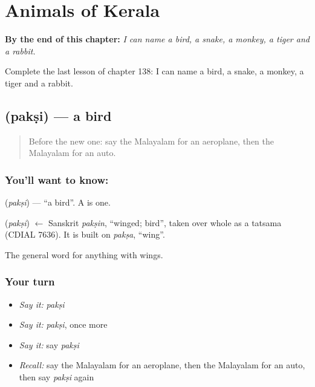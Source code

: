 
\chapter{Animals of Kerala}
\label{ch:ml-animals-of-kerala}

\begin{chapteropening}
\textbf{By the end of this chapter:} \emph{I can name a bird, a snake, a monkey, a tiger and a rabbit.}

Complete the last lesson of chapter 138: I can name a bird, a snake, a monkey, a tiger and a rabbit.
\end{chapteropening}

\section[\texorpdfstring{\ml{പക്ഷി} (pakṣi)}{പക്ഷി (pakṣi)}]{ (pakṣi) — a bird}

\label{lesson:ML-C138-bird}



\begin{quote}
Before the new one: say the Malayalam for an aeroplane, then the Malayalam for an auto.
\end{quote}

\subsection*{You'll want to know: }
\textbf{} (\emph{pakṣi}) — \textquotedblleft{}a bird\textquotedblright{}. A \textbf{} is one.

\begin{cousinweb}
\textbf{} (\emph{pakṣi}) $\leftarrow$ Sanskrit \emph{pakṣin}, \textquotedblleft{}winged; bird\textquotedblright{}, taken over whole as a tatsama (CDIAL 7636). It is built on \emph{pakṣa}, \textquotedblleft{}wing\textquotedblright{}.
\end{cousinweb}

\begin{grammarlens}[title={What you've built}]
The general word for anything with wings.
\end{grammarlens}

\subsection*{Your turn}
\begin{itemize}
\raggedright
  \item \emph{Say it:} \emph{pakṣi}
  \item \emph{Say it:} \emph{pakṣi}, once more
  \item \emph{Say it:} say \emph{pakṣi}
  \item \emph{Recall:} say the Malayalam for an aeroplane, then the Malayalam for an auto, then say \emph{pakṣi} again
\end{itemize}


